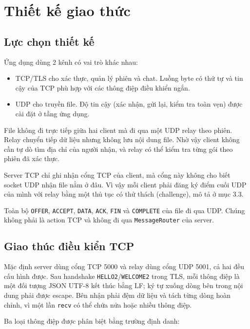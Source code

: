 \section{Thiết kế giao thức}

\subsection{Lực chọn thiết kế}
Ứng dụng dùng 2 kênh có vai trò khác nhau:
\begin{itemize}
    \item TCP/TLS cho xác thực, quản lý phiên và chat. Luồng byte có thứ tự và tin cậy của TCP phù hợp với các thông điệp điều khiển ngắn.
    \item UDP cho truyền file. Độ tin cậy (xác nhận, gửi lại, kiểm tra toàn vẹn) được cài đặt ở tầng ứng dụng.
\end{itemize}

File không đi trực tiếp giữa hai client mà đi qua một UDP relay theo phiên. Relay chuyển tiếp dữ liệu nhưng không lưu nội dung file. Nhờ vậy client không cần tự dò tìm địa chỉ của người nhận, và relay có thể kiểm tra từng gói theo phiên đã xác thực.

Server TCP chỉ ghi nhận cổng TCP của client, mà cổng này không cho biết socket UDP nhận file nằm ở đâu. Vì vậy mỗi client phải đăng ký điểm cuối UDP của mình với relay bằng một thủ tục có thử thách (challenge), mô tả ở mục 3.3.

Toàn bộ \texttt{OFFER}, \texttt{ACCEPT}, \texttt{DATA}, \texttt{ACK}, \texttt{FIN} và \texttt{COMPLETE} của file đi qua UDP. Chúng không phải là action TCP và không đi qua \texttt{MessageRouter} của server.

\subsection{Giao thúc điều kiển TCP}
Mặc định server dùng cổng TCP 5000 và relay dùng cổng UDP 5001, cả hai đều cấu hình được. Sau handshake \texttt{HELLO2}/\texttt{WELCOME2} trong TLS, mỗi thông điệp là một đối tượng JSON UTF-8 kết thúc bằng LF; ký tự xuống dòng bên trong nội dung phải được escape. Bên nhận phải đệm dữ liệu và tách từng dòng hoàn chỉnh, vì một lần \texttt{recv} có thể chứa nửa hoặc nhiều thông điệp.

Ba loại thông điệp được phân biệt bằng trường định danh:

